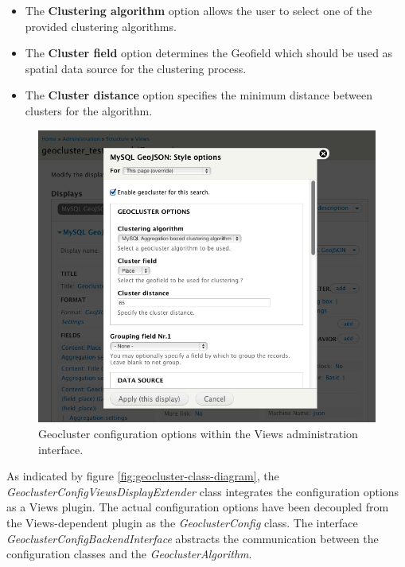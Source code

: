 \begin{itemize}

\item The \textbf{Clustering algorithm} option allows the user to select one of the provided clustering algorithms.

\item The \textbf{Cluster field} option determines the Geofield which should be used as spatial data source for the clustering process. 

\item The \textbf{Cluster distance} option specifies the minimum distance between clusters for the algorithm.

\end{itemize}

\begin{figure}[h]
  \begin{center}
    \includegraphics[width=1\textwidth]{figures/geocluster_configuration.png}
    \caption{Geocluster configuration options within the Views administration interface.}
    \label{fig:geocluster-configuration}
  \end{center}
\end{figure}

As indicated by figure \ref{fig:geocluster-class-diagram}, the \textit{GeoclusterConfigViewsDisplayExtender} class integrates the configuration options as a Views plugin. The actual configuration options have been decoupled from the Views-dependent plugin as the \textit{GeoclusterConfig} class. The interface \textit{GeoclusterConfigBackendInterface} abstracts the communication between the configuration classes and the \textit{GeoclusterAlgorithm}. 


